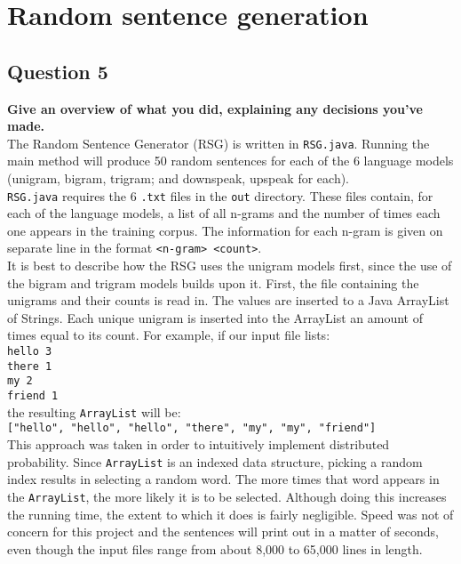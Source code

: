 \documentclass{article} %
\begin{document}

\lipsum[2] %

\section{Random sentence generation}
\subsection*{Question 5}

\textbf{Give an overview of what you did, explaining any decisions you've made.}
\\

The Random Sentence Generator (RSG) is written in \texttt{RSG.java}. Running the main method will produce 50 random sentences for each of the 6 language models (unigram, bigram, trigram; and downspeak, upspeak for each).\\

\texttt{RSG.java} requires the 6 \texttt{.txt} files in the \texttt{out} directory. These files contain, for each of the language models, a list of all n-grams and the number of times each one appears in the training corpus. The information for each n-gram is given on separate line in the format  \texttt{<n-gram> <count>}.\\

It is best to describe how the RSG uses the unigram models first, since the use of the bigram and trigram models builds upon it. First, the file containing the unigrams and their counts is read in. The values are inserted to a Java ArrayList of Strings. Each unique unigram is inserted into the ArrayList an amount of times equal to its count. For example, if our input file lists:\\

\texttt{hello 3\\
there 1\\
my 2\\
friend 1}\\

the resulting  \texttt{ArrayList} will be:\\

\texttt{["hello", "hello", "hello", "there", "my", "my", "friend"]}\\

This approach was taken in order to intuitively implement distributed probability. Since  \texttt{ArrayList} is an indexed data structure, picking a random index results in selecting a random word. The more times that word appears in the  \texttt{ArrayList}, the more likely it is to be selected. Although doing this increases the running time, the extent to which it does is fairly negligible. Speed was not of concern for this project and the sentences will print out in a matter of seconds, even though the input files range from about 8,000 to 65,000 lines in length.\\
\end{document}
